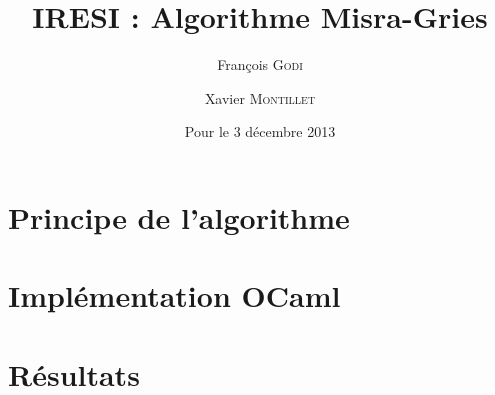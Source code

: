 \documentclass{article}
\title{IRESI : Algorithme Misra-Gries}
\author{\author{François \textsc{Godi} \and Xavier \textsc{Montillet}}}
\date{Pour le 3 décembre 2013}
\begin{document}
	
\maketitle
\tableofcontents

\section{Principe de l'algorithme}

\section{Implémentation OCaml}

\section{Résultats}
\end{document}
